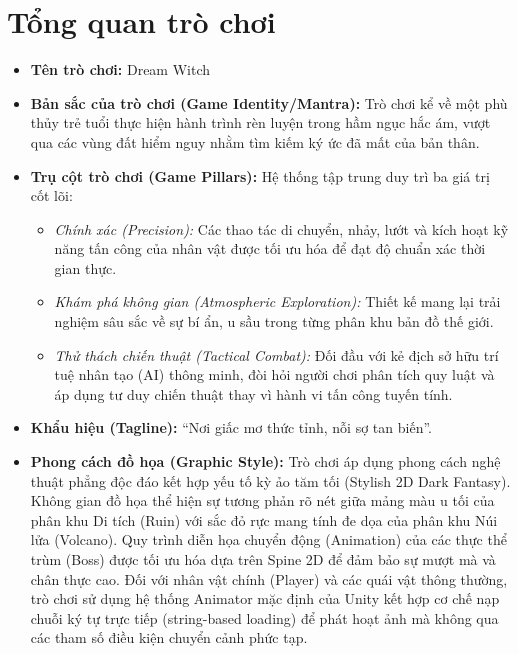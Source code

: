 \documentclass[../DoAn.tex]{subfiles}
\begin{document}
\section{Tổng quan trò chơi}
\label{section:design:3.1}


\begin{itemize}
    \item \textbf{Tên trò chơi:} Dream Witch
    \item \textbf{Bản sắc của trò chơi (Game Identity/Mantra):} Trò chơi kể về một phù thủy trẻ tuổi thực hiện hành trình rèn luyện trong hầm ngục hắc ám, vượt qua các vùng đất hiểm nguy nhằm tìm kiếm ký ức đã mất của bản thân. 
    \item \textbf{Trụ cột trò chơi (Game Pillars):} Hệ thống tập trung duy trì ba giá trị cốt lõi:
    \begin{itemize}
        \item \textit{Chính xác (Precision):} Các thao tác di chuyển, nhảy, lướt và kích hoạt kỹ năng tấn công của nhân vật được tối ưu hóa để đạt độ chuẩn xác thời gian thực.
        \item \textit{Khám phá không gian (Atmospheric Exploration):} Thiết kế mang lại trải nghiệm sâu sắc về sự bí ẩn, u sầu trong từng phân khu bản đồ thế giới.
        \item \textit{Thử thách chiến thuật (Tactical Combat):} Đối đầu với kẻ địch sở hữu trí tuệ nhân tạo (AI) thông minh, đòi hỏi người chơi phân tích quy luật và áp dụng tư duy chiến thuật thay vì hành vi tấn công tuyến tính.
    \end{itemize}
    \item \textbf{Khẩu hiệu (Tagline):} ``Nơi giấc mơ thức tỉnh, nỗi sợ tan biến''. 
    \item \textbf{Phong cách đồ họa (Graphic Style):} Trò chơi áp dụng phong cách nghệ thuật phẳng độc đáo kết hợp yếu tố kỳ ảo tăm tối (Stylish 2D Dark Fantasy). Không gian đồ họa thể hiện sự tương phản rõ nét giữa mảng màu u tối của phân khu Di tích (Ruin) với sắc đỏ rực mang tính đe dọa của phân khu Núi lửa (Volcano). Quy trình diễn họa chuyển động (Animation) của các thực thể trùm (Boss) được tối ưu hóa dựa trên Spine 2D để đảm bảo sự mượt mà và chân thực cao. Đối với nhân vật chính (Player) và các quái vật thông thường, trò chơi sử dụng hệ thống Animator mặc định của Unity kết hợp cơ chế nạp chuỗi ký tự trực tiếp (string-based loading) để phát hoạt ảnh mà không qua các tham số điều kiện chuyển cảnh phức tạp.
\end{itemize}
\end{document}
